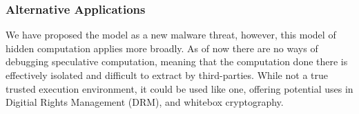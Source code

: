 


\subsubsection{Alternative Applications}
We have proposed the \speculake model as a new malware threat, however, this
model of hidden computation applies more broadly. As of now there are no ways of
debugging speculative computation, meaning that the computation done there is
effectively isolated and difficult to extract by third-parties. While not a true
trusted execution environment, it could be used like one, offering potential
uses in Digitial Rights Management (DRM), and whitebox cryptography.



